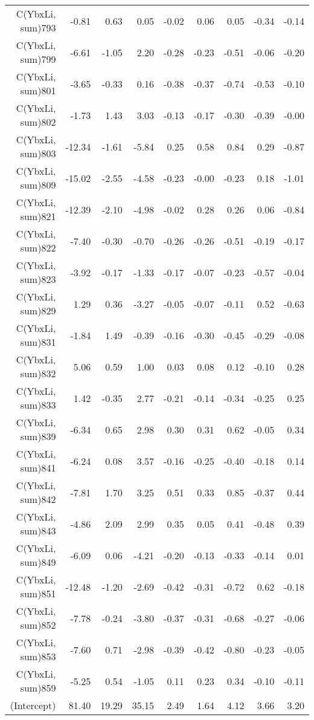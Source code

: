 \begin{table}[p]
\begin{tabular}{rrrrrrrrr}
  C(YbxLi, sum)793 & -0.81 & 0.63 & 0.05 & -0.02 & 0.06 & 0.05 & -0.34 & -0.14 \\ 
  C(YbxLi, sum)799 & -6.61 & -1.05 & 2.20 & -0.28 & -0.23 & -0.51 & -0.06 & -0.20 \\ 
  C(YbxLi, sum)801 & -3.65 & -0.33 & 0.16 & -0.38 & -0.37 & -0.74 & -0.53 & -0.10 \\ 
  C(YbxLi, sum)802 & -1.73 & 1.43 & 3.03 & -0.13 & -0.17 & -0.30 & -0.39 & -0.00 \\ 
  C(YbxLi, sum)803 & -12.34 & -1.61 & -5.84 & 0.25 & 0.58 & 0.84 & 0.29 & -0.87 \\ 
  C(YbxLi, sum)809 & -15.02 & -2.55 & -4.58 & -0.23 & -0.00 & -0.23 & 0.18 & -1.01 \\ 
  C(YbxLi, sum)821 & -12.39 & -2.10 & -4.98 & -0.02 & 0.28 & 0.26 & 0.06 & -0.84 \\ 
  C(YbxLi, sum)822 & -7.40 & -0.30 & -0.70 & -0.26 & -0.26 & -0.51 & -0.19 & -0.17 \\ 
  C(YbxLi, sum)823 & -3.92 & -0.17 & -1.33 & -0.17 & -0.07 & -0.23 & -0.57 & -0.04 \\ 
  C(YbxLi, sum)829 & 1.29 & 0.36 & -3.27 & -0.05 & -0.07 & -0.11 & 0.52 & -0.63 \\ 
  C(YbxLi, sum)831 & -1.84 & 1.49 & -0.39 & -0.16 & -0.30 & -0.45 & -0.29 & -0.08 \\ 
  C(YbxLi, sum)832 & 5.06 & 0.59 & 1.00 & 0.03 & 0.08 & 0.12 & -0.10 & 0.28 \\ 
  C(YbxLi, sum)833 & 1.42 & -0.35 & 2.77 & -0.21 & -0.14 & -0.34 & -0.25 & 0.25 \\ 
  C(YbxLi, sum)839 & -6.34 & 0.65 & 2.98 & 0.30 & 0.31 & 0.62 & -0.05 & 0.34 \\ 
  C(YbxLi, sum)841 & -6.24 & 0.08 & 3.57 & -0.16 & -0.25 & -0.40 & -0.18 & 0.14 \\ 
  C(YbxLi, sum)842 & -7.81 & 1.70 & 3.25 & 0.51 & 0.33 & 0.85 & -0.37 & 0.44 \\ 
  C(YbxLi, sum)843 & -4.86 & 2.09 & 2.99 & 0.35 & 0.05 & 0.41 & -0.48 & 0.39 \\ 
  C(YbxLi, sum)849 & -6.09 & 0.06 & -4.21 & -0.20 & -0.13 & -0.33 & -0.14 & 0.01 \\ 
  C(YbxLi, sum)851 & -12.48 & -1.20 & -2.69 & -0.42 & -0.31 & -0.72 & 0.62 & -0.18 \\ 
  C(YbxLi, sum)852 & -7.78 & -0.24 & -3.80 & -0.37 & -0.31 & -0.68 & -0.27 & -0.06 \\ 
  C(YbxLi, sum)853 & -7.60 & 0.71 & -2.98 & -0.39 & -0.42 & -0.80 & -0.23 & -0.05 \\ 
  C(YbxLi, sum)859 & -5.25 & 0.54 & -1.05 & 0.11 & 0.23 & 0.34 & -0.10 & -0.11 \\ 
  (Intercept) & 81.40 & 19.29 & 35.15 & 2.49 & 1.64 & 4.12 & 3.66 & 3.20 \\ 
   \hline
\end{tabular}
\end{table}
